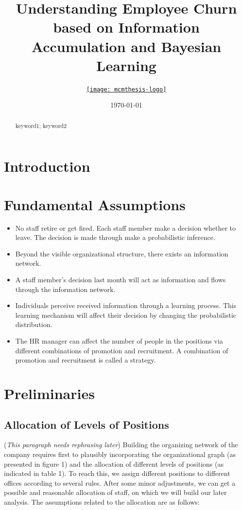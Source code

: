 \documentclass[tcn = 37075, sheet = true, abstract = true]{mcmthesis}
\title{Understanding Employee Churn based on Information Accumulation and Bayesian Learning}
\author{\small \href{http://www.latexstudio.net/}
  {\texttt{[image: mcmthesis-logo]}}}
\date{\today}
\begin{document}
\begin{abstract}
\lipsum[1]
\begin{keywords}
keyword1; keyword2
\end{keywords}
\end{abstract}
\maketitle
\newpage

\setcounter{tocdepth}{2}
\tableofcontents

\newpage
\section{Introduction}

\section{Fundamental Assumptions}

\begin{itemize}
\item No staff retire or get fired. Each staff member make a decision whether to leave. The decision is made through make a probabilistic inference.
\item Beyond the visible organizational structure, there exists an information network.
\item A staff member's decision last month will act as information and flows through the information network.
\item Individuals perceive received information through a learning process. This learning mechanism will affect their decision by changing the probabilistic distribution.
\item The HR manager can affect the number of people in the positions via different combinations of promotion and recruitment. A combination of promotion and recruitment is called a strategy.
\end{itemize}

\section{Preliminaries}

\subsection{Allocation of Levels of Positions}

(\textit{This paragraph needs rephrasing later}) Building the organizing network of the company requires first to plausibly incorporating the organizational graph (as presented in figure 1) and the allocation of different levels of positions (as indicated in table 1). To reach this, we assign different positions to different offices according to several rules. After some minor adjustments, we can get a possible and reasonable allocation of staff, on which we will build our later analysis. The assumptions related to the allocation are as follows:
\end{document}

